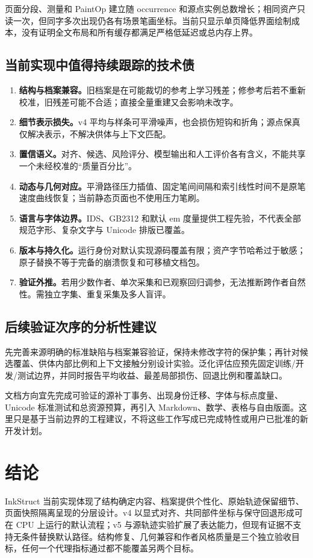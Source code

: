 \documentclass[UTF8,a4paper,11pt,fontset=fandol]{ctexart}
\begin{document}
页面分段、测量和 PaintOp 建立随 occurrence 和源点实例总数增长；相同资产只读一次，但同字多次出现仍各有场景笔画坐标。当前只显示单页降低界面绘制成本，没有证明全文布局和所有缓存都满足严格低延迟或总内存上界。

\subsection{当前实现中值得持续跟踪的技术债}
\begin{enumerate}
\item \textbf{结构与档案兼容。}旧档案是在可能裁切的参考上学习残差；修参考后若不重新校准，旧残差可能不合适；直接全量重建又会影响未改字。
\item \textbf{细节表示损失。}v4 平均与样条可平滑噪声，也会损伤短钩和折角；源点保真仅解决表示，不解决供体与上下文匹配。
\item \textbf{置信语义。}对齐、候选、风险评分、模型输出和人工评价各有含义，不能共享一个未经校准的“质量百分比”。
\item \textbf{动态与几何对应。}平滑路径压力插值、固定笔间间隔和索引线性时间不是原笔速度曲线恢复；当前静态页面也不使用压力笔刷。
\item \textbf{语言与字体边界。}IDS、GB2312 和默认 em 度量提供工程先验，不代表全部规范字形、复杂文字与 Unicode 排版已覆盖。
\item \textbf{版本与持久化。}运行身份对默认实现源码覆盖有限；资产字节哈希过于敏感；原子替换不等于完备的崩溃恢复和可移植文档包。
\item \textbf{验证外推。}若用少数作者、单次采集和已观察回归调参，无法推断跨作者自然性。需独立字集、重复采集及多人盲评。
\end{enumerate}

\subsection{后续验证次序的分析性建议}
先完善来源明确的标准缺陷与档案兼容验证，保持未修改字符的保护集；再针对候选覆盖、供体内部比例和上下文接触分别设计实验。泛化评估应预先固定训练/开发/测试边界，并同时报告平均收益、最差局部损伤、回退比例和覆盖缺口。

文档方向宜先完成可验证的源补丁事务、出现身份迁移、字体与标点度量、Unicode 标准测试和总资源预算，再引入 Markdown、数学、表格与自由版面。这里只是基于当前边界的工程建议，不将这些工作写成已完成特性或用户已批准的新开发计划。

\section{结论}
InkStruct 当前实现体现了结构确定内容、档案提供个性化、原始轨迹保留细节、页面快照隔离呈现的分层设计。v4 以显式对齐、共同部件坐标与保守回退形成可在 CPU 上运行的默认流程；v5 与源轨迹实验扩展了表达能力，但现有证据不支持无条件替换默认路径。结构修复、几何兼容和作者风格质量是三个独立验收目标，任何一个代理指标通过都不能覆盖另两个目标。
\end{document}
